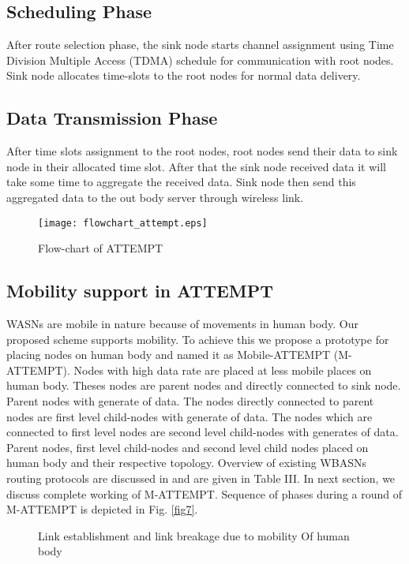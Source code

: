 \documentclass[journal]{IEEEtran}
\begin{document}
\subsection{Scheduling Phase}
After route selection phase, the sink node starts channel assignment using Time Division Multiple Access (TDMA) schedule for communication with root nodes. Sink node allocates time-slots to the root nodes for normal data delivery.

\subsection{Data Transmission Phase}
After time slots assignment to the root nodes, root nodes send their data to sink node in their allocated time slot. After that the sink node received data it will take some time to aggregate the received data. Sink node then send this aggregated data to the out body server through wireless link.	

\begin{figure}[ht]
\begin{center}
\texttt{[image: flowchart\_attempt.eps]}
\caption{Flow-chart of ATTEMPT}\label{fig5}
\end{center}
\end{figure}

\subsection{Mobility support in ATTEMPT}
WASNs are mobile in nature because of movements in human body. Our proposed scheme supports mobility. To achieve this we propose a prototype for placing nodes on human body and named it as Mobile-ATTEMPT (M-ATTEMPT). Nodes with high data rate are placed at less mobile places on human body. Theses nodes are parent nodes and directly connected to sink node. Parent nodes with  generate  of data. The nodes directly connected to parent nodes are first level child-nodes with  generate  of data. The nodes which are connected to first level nodes are second level child-nodes with  generates  of data. Parent nodes, first level child-nodes and second level child nodes placed on human body and their respective topology. Overview of existing WBASNs routing protocols are discussed in \cite{ullah2010comprehensive} and are given in Table III. In next section, we discuss complete working of M-ATTEMPT. Sequence of phases during a round of M-ATTEMPT is depicted in Fig. \ref{fig7}.

\begin{figure*}[ht]
  \centering
  \caption{Link establishment and link breakage due to mobility Of human body}\label{fig6}
\end{figure*}
\end{document}

